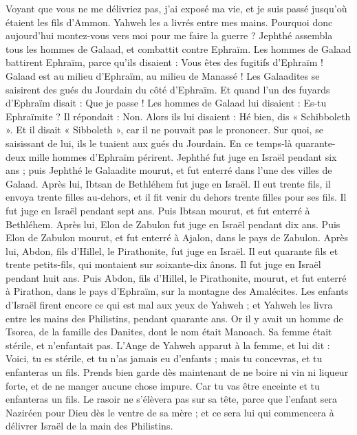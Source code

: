 \begin{multicols}{2}
Voyant que vous ne me délivriez pas, j'ai exposé ma vie, et je suis passé jusqu'où étaient les fils d'Ammon. Yahweh les a livrés entre mes mains. Pourquoi donc aujourd'hui montez-vous vers moi pour me faire la guerre ?
Jephthé assembla tous les hommes de Galaad, et combattit contre Ephraïm. Les hommes de Galaad battirent Ephraïm, parce qu'ils disaient : Vous êtes des fugitifs d'Ephraïm ! Galaad est au milieu d'Ephraïm, au milieu de Manassé !
Les Galaadites se saisirent des gués du Jourdain du côté d'Ephraïm. Et quand l'un des fuyards d'Ephraïm disait : Que je passe ! Les hommes de Galaad lui disaient : Es-tu Ephraïmite ? Il répondait : Non.
Alors ils lui disaient : Hé bien, dis « Schibboleth ». Et il disait « Sibboleth », car il ne pouvait pas le prononcer. Sur quoi, se saisissant de lui, ils le tuaient aux gués du Jourdain. En ce temps-là quarante-deux mille hommes d'Ephraïm périrent.
Jephthé fut juge en Israël pendant six ans ; puis Jephthé le Galaadite mourut, et fut enterré dans l'une des villes de Galaad.
Après lui, Ibtsan de Bethléhem fut juge en Israël.
Il eut trente fils, il envoya trente filles au-dehors, et il fit venir du dehors trente filles pour ses fils. Il fut juge en Israël pendant sept ans.
Puis Ibtsan mourut, et fut enterré à Bethléhem.
Après lui, Elon de Zabulon fut juge en Israël pendant dix ans.
Puis Elon de Zabulon mourut, et fut enterré à Ajalon, dans le pays de Zabulon.
Après lui, Abdon, fils d'Hillel, le Pirathonite, fut juge en Israël.
Il eut quarante fils et trente petits-fils, qui montaient sur soixante-dix ânons. Il fut juge en  Israël pendant huit ans.
Puis Abdon, fils d'Hillel, le Pirathonite, mourut, et fut enterré à Pirathon, dans le pays d'Ephraïm, sur la montagne des Amalécites.
\VerseOne{}Les enfants d'Israël firent encore ce qui est mal aux yeux de Yahweh ; et Yahweh les livra entre les mains des Philistins, pendant quarante ans.
Or il y avait un homme de Tsorea, de la famille des Danites, dont le nom était Manoach. Sa femme était stérile, et n'enfantait pas.
L’Ange de Yahweh apparut à la femme, et lui dit : Voici, tu es stérile, et tu n'as jamais eu d'enfants ; mais tu concevras, et tu enfanteras un fils.
Prends bien garde dès maintenant de ne boire ni vin ni liqueur forte, et de ne manger aucune chose impure.
Car tu vas être enceinte et tu enfanteras un fils. Le rasoir ne s'élèvera pas sur sa tête, parce que l'enfant sera Naziréen pour Dieu dès le ventre de sa mère ; et ce sera lui qui commencera à délivrer Israël de la main des Philistins.

\end{multicols}
